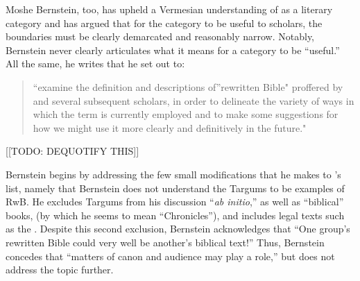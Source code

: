  Moshe Bernstein, too, has upheld a Vermesian understanding of \rwb as a literary category and has argued that for the category to be useful to scholars, the boundaries must be clearly demarcated and reasonably narrow.\autocite{bernstein_textus2005} Notably, Bernstein never clearly articulates what it means for a category to be ``useful.'' All the same, he writes that he set out to: 

 \begin{quote} ``examine the definition and descriptions of''rewritten Bible" proffered by \vermes and several subsequent scholars, in order to delineate the variety of ways in which the term is currently employed and to make some suggestions for how we might use it more clearly and definitively in the future." \autocite[171--172]{bernstein_textus2005} \end{quote} [[TODO: DEQUOTIFY THIS]]

 Bernstein begins by addressing the few small modifications that he makes to \vermes's list, namely that Bernstein does not understand the Targums to be examples of RwB. He excludes Targums from his discussion ``\emph{ab initio},'' as well as ``biblical'' books, (by which he seems to mean ``Chronicles''), and includes legal texts such as the \templescroll. Despite this second exclusion, Bernstein acknowledges that ``One group's rewritten Bible could very well be another's biblical text!'' \autocite[175. This seems particularly odd, since, and Ethiopian Christian may protest that \jub should be excluded as well.]{bernstein_textus2005} Thus, Bernstein concedes that ``matters of canon and audience may play a role,'' but does not address the topic further. 


